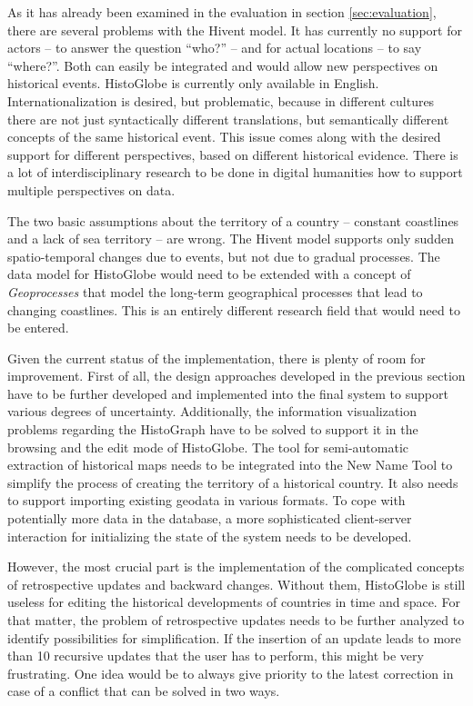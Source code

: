 As it has already been examined in the evaluation in section \ref{sec:evaluation}, there are several problems with the Hivent model. It has currently no support for actors -- to answer the question ``who?'' -- and for actual locations -- to say ``where?''. Both can easily be integrated and would allow new perspectives on historical events. HistoGlobe is currently only available in English. Internationalization is desired, but problematic, because in different cultures there are not just syntactically different translations, but semantically different concepts of the same historical event. This issue comes along with the desired support for different perspectives, based on different historical evidence. There is a lot of interdisciplinary research to be done in digital humanities how to support multiple perspectives on data.

The two basic assumptions about the territory of a country -- constant coastlines and a lack of sea territory -- are wrong. The Hivent model supports only sudden spatio-temporal changes due to events, but not due to gradual processes. The data model for HistoGlobe would need to be extended with a concept of \emph{Geoprocesses} that model the long-term geographical processes that lead to changing coastlines. This is an entirely different research field that would need to be entered.

Given the current status of the implementation, there is plenty of room for improvement. First of all, the design approaches developed in the previous section have to be further developed and implemented into the final system to support various degrees of uncertainty. Additionally, the information visualization problems regarding the HistoGraph have to be solved to support it in the browsing and the edit mode of HistoGlobe. The tool for semi-automatic extraction of historical maps needs to be integrated into the New Name Tool to simplify the process of creating the territory of a historical country. It also needs to support importing existing geodata in various formats. To cope with potentially more data in the database, a more sophisticated client-server interaction for initializing the state of the system needs to be developed.

However, the most crucial part is the implementation of the complicated concepts of retrospective updates and backward changes. Without them, HistoGlobe is still useless for editing the historical developments of countries in time and space. For that matter, the problem of retrospective updates needs to be further analyzed to identify possibilities for simplification. If the insertion of an update leads to more than 10 recursive updates that the user has to perform, this might be very frustrating. One idea would be to always give priority to the latest correction in case of a conflict that can be solved in two ways.

